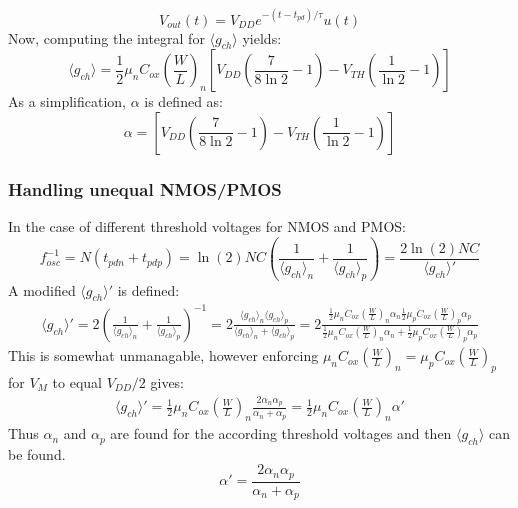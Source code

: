 			\begin{equation}
				V_{out}(t) = V_{DD}e^{-(t-t_{pd})/\tau}u(t)
			\end{equation}
			Now, computing the integral for $\langle g_{ch} \rangle$ yields:
			\begin{equation}
				\langle g_{ch} \rangle = \frac{1}{2}\mu_nC_{ox}\left(\frac{W}{L}\right)_n\left[V_{DD}\left(\frac{7}{8\ln2}-1\right)-V_{TH}\left(\frac{1}{\ln2}-1\right) \right]
			\end{equation}
			As a simplification, $\alpha$ is defined as:
			\begin{equation}
				\alpha = \left[V_{DD}\left(\frac{7}{8\ln2}-1\right)-V_{TH}\left(\frac{1}{\ln2}-1\right) \right]
			\end{equation}	
		
		\subsubsection{Handling unequal NMOS/PMOS}
			In the case of different threshold voltages for NMOS and PMOS:
			\begin{equation}
				f_{osc}^{-1} = N(t_{pdn} + t_{pdp}) = \ln(2)NC\left(\frac{1}{\langle g_{ch}\rangle_n} + \frac{1}{\langle g_{ch}\rangle_p}\right) = \frac{2\ln(2)NC}{\langle g_{ch}\rangle'}
			\end{equation}	
			A modified $\langle g_{ch}\rangle'$ is defined:
			\begin{align}
				\langle g_{ch}\rangle' = 2\left(\frac{1}{\langle g_{ch}\rangle_n} + \frac{1}{\langle g_{ch}\rangle_p}\right)^{-1} = 2\frac{\langle g_{ch}\rangle_n \langle g_{ch}\rangle_p}{\langle g_{ch}\rangle_n + \langle g_{ch}\rangle_p}
				= 2\frac{\frac{1}{2}\mu_nC_{ox}\left(\frac{W}{L}\right)_n \alpha_n\frac{1}{2}\mu_pC_{ox}\left(\frac{W}{L}\right)_p \alpha_p}{\frac{1}{2}\mu_nC_{ox}\left(\frac{W}{L}\right)_n\alpha_n + \frac{1}{2}\mu_pC_{ox}\left(\frac{W}{L}\right)_p\alpha_p}
			\end{align}	
			This is somewhat unmanagable, however enforcing $\mu_nC_{ox}\left(\frac{W}{L}\right)_n = \mu_pC_{ox}\left(\frac{W}{L}\right)_p$ for $V_M$ to equal $V_{DD}/2$ gives:
			\begin{align}
				\langle g_{ch}\rangle' = \frac{1}{2}\mu_nC_{ox}\left(\frac{W}{L}\right)_n\frac{2 \alpha_n\alpha_p}{\alpha_n + \alpha_p} = \frac{1}{2}\mu_nC_{ox}\left(\frac{W}{L}\right)_n \alpha'
			\end{align}	
			Thus $\alpha_n$ and $\alpha_p$ are found for the according threshold voltages and then $\langle g_{ch}\rangle$ can be found.
			\begin{equation}
				\alpha' =  \frac{2 \alpha_n\alpha_p}{\alpha_n + \alpha_p}
			\end{equation}

